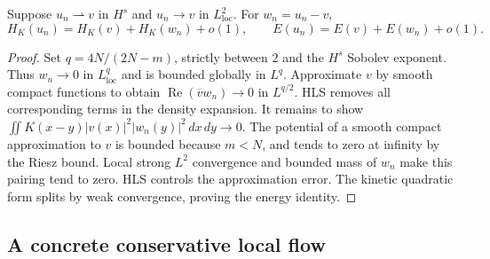 \begin{lemma}
\label{lem:r13g-hartree-splitting}
Suppose $u_n\rightharpoonup v$ in $H^s$ and $u_n\to v$ in
$L^2_{\mathrm{loc}}$. For $w_n=u_n-v$,
\[
 H_K(u_n)=H_K(v)+H_K(w_n)+o(1),\qquad
 E(u_n)=E(v)+E(w_n)+o(1).
\]
\end{lemma}
\begin{proof}
Set $q=4N/(2N-m)$, strictly between $2$ and the $H^s$ Sobolev
exponent. Thus $w_n\to0$ in $L^q_{\mathrm{loc}}$ and is bounded
globally in $L^q$. Approximate $v$ by smooth compact functions to
obtain $\operatorname{Re}(\overline v w_n)\to0$ in $L^{q/2}$.
HLS removes all corresponding terms in the density expansion.
It remains to show
$\iint K(x-y)|v(x)|^2|w_n(y)|^2\,dx\,dy\to0$.
The potential of a smooth compact approximation to $v$ is bounded
because $m<N$, and tends to zero at infinity by the Riesz bound.
Local strong $L^2$ convergence and bounded mass of $w_n$ make this
pairing tend to zero. HLS controls the approximation error.
The kinetic quadratic form splits by weak convergence, proving the
energy identity.
\end{proof}

\subsection{A concrete conservative local flow}

